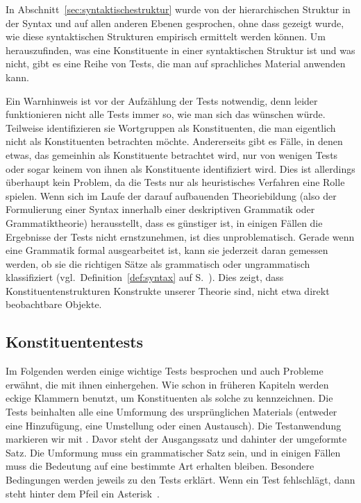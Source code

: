 
In Abschnitt~\ref{sec:syntaktischestruktur} wurde von der hierarchischen Struktur in der Syntax und auf allen anderen Ebenen gesprochen, ohne dass gezeigt wurde, wie diese syntaktischen Strukturen empirisch ermittelt werden können.
Um herauszufinden, was eine Konstituente in einer syntaktischen Struktur ist und was nicht, gibt es eine Reihe von Tests, die man auf sprachliches Material anwenden kann.

Ein Warnhinweis ist vor der Aufzählung der Tests notwendig, denn leider funktionieren nicht alle Tests immer so, wie man sich das wünschen würde.
Teilweise identifizieren sie Wortgruppen als Konstituenten, die man eigentlich nicht als Konstituenten betrachten möchte.
Andererseits gibt es Fälle, in denen etwas, das gemeinhin als Konstituente betrachtet wird, nur von wenigen Tests oder sogar keinem von ihnen als Konstituente identifiziert wird.
Dies ist allerdings überhaupt kein Problem, da die Tests nur als heuristisches Verfahren eine Rolle spielen.
Wenn sich im Laufe der darauf aufbauenden Theoriebildung (also der Formulierung einer Syntax innerhalb einer deskriptiven Grammatik oder Grammatiktheorie) herausstellt, dass es günstiger ist, in einigen Fällen die Ergebnisse der Tests nicht ernstzunehmen, ist dies unproblematisch.
Gerade wenn eine Grammatik formal ausgearbeitet ist, kann sie jederzeit daran gemessen werden, ob sie die richtigen Sätze als grammatisch oder ungrammatisch klassifiziert (vgl.\ Definition~\ref{def:syntax} auf S.~\pageref{def:syntax}).
Dies zeigt, dass Konstituentenstrukturen Konstrukte unserer Theorie sind, nicht etwa direkt beobachtbare Objekte.

\subsection{Konstituententests}

\label{sec:konstituententestsimeinzelnen}

Im Folgenden werden einige wichtige Tests besprochen und auch Probleme erwähnt, die mit ihnen einhergehen.
Wie schon in früheren Kapiteln werden eckige Klammern benutzt, um Konstituenten als solche zu kennzeichnen.
Die Tests beinhalten alle eine Umformung des ursprünglichen Materials (entweder eine Hinzufügung, eine Umstellung oder einen Austausch).
Die Testanwendung markieren wir mit .
Davor steht der Ausgangssatz und dahinter der umgeformte Satz.
Die Umformung muss ein grammatischer Satz sein, und in einigen Fällen muss die Bedeutung auf eine bestimmte Art erhalten bleiben.
Besondere Bedingungen werden jeweils zu den Tests erklärt.
Wenn ein Test fehlschlägt, dann steht hinter dem Pfeil ein Asterisk~\Ast.

